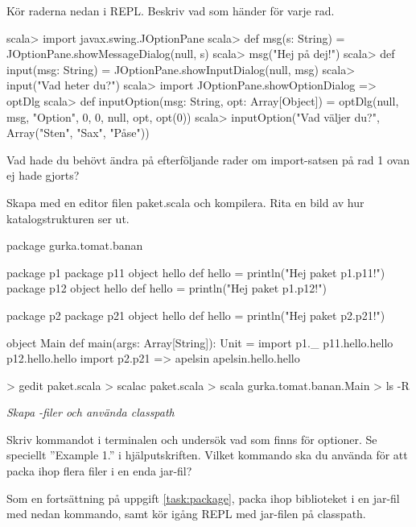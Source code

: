 \Subtask Kör raderna nedan i REPL. Beskriv vad som händer för varje rad.
\begin{REPL}[numbers=left, numberstyle=\color{black}\ttfamily\scriptsize\selectfont]
scala> import javax.swing.JOptionPane
scala> def msg(s: String) = JOptionPane.showMessageDialog(null, s)
scala> msg("Hej på dej!")
scala> def input(msg: String) = JOptionPane.showInputDialog(null, msg)
scala> input("Vad heter du?")
scala> import JOptionPane.{showOptionDialog => optDlg}
scala> def inputOption(msg: String, opt: Array[Object]) = 
         optDlg(null, msg, "Option", 0, 0, null, opt, opt(0))
scala> inputOption("Vad väljer du?", Array("Sten", "Sax", "Påse"))
\end{REPL} 

\Subtask\Pen Vad hade du behövt ändra på efterföljande rader om import-satsen på rad 1 ovan ej hade gjorts?

\Subtask Skapa med en editor filen paket.scala och kompilera. Rita en bild av hur katalogstrukturen ser ut.

\begin{Code}
package gurka.tomat.banan

package p1 {
  package p11 {
    object hello {
      def hello = println("Hej paket p1.p11!")
    }
  }
  package p12 {
    object hello {
      def hello = println("Hej paket p1.p12!")
    }
  }
}

package p2 {
  package p21 {
    object hello {
      def hello = println("Hej paket p2.p21!")
    }
  }
}

object Main {
  def main(args: Array[String]): Unit = {
    import p1._
    p11.hello.hello
    p12.hello.hello
    import p2.{p21 => apelsin}
    apelsin.hello.hello
  }
}
\end{Code}

\begin{REPL}
> gedit paket.scala
> scalac paket.scala
> scala gurka.tomat.banan.Main
> ls -R
\end{REPL}

\Task \emph{Skapa -filer och använda classpath}

\Subtask Skriv kommandot  i terminalen och undersök vad som finns för optioner. Se speciellt ''Example 1.'' i hjälputskriften. Vilket kommando ska du använda för att packa ihop flera filer i en enda jar-fil?

\Subtask Som en fortsättning på uppgift \ref{task:package}, packa ihop biblioteket  i en jar-fil med nedan kommando, samt kör igång REPL med jar-filen på classpath.

